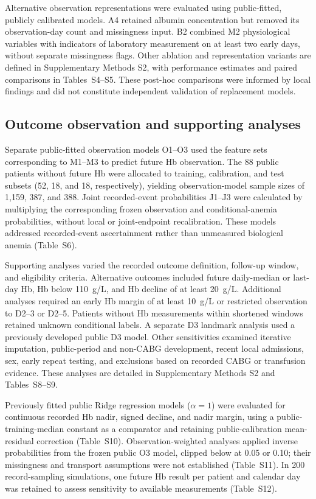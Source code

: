 \documentclass[pdflatex,sn-mathphys-num]{sn-jnl}%
\theoremstyle{thmstyleone}%
\theoremstyle{thmstyletwo}%
\theoremstyle{thmstylethree}%
\begin{document}
Alternative observation representations were evaluated using public-fitted, publicly calibrated models. A4 retained albumin concentration but removed its observation-day count and missingness input. B2 combined M2 physiological variables with indicators of laboratory measurement on at least two early days, without separate missingness flags. Other ablation and representation variants are defined in Supplementary Methods S2, with performance estimates and paired comparisons in Tables~S4--S5. These post-hoc comparisons were informed by local findings and did not constitute independent validation of replacement models.

\subsection{Outcome observation and supporting analyses}

Separate public-fitted observation models O1--O3 used the feature sets corresponding to M1--M3 to predict future Hb observation. The 88 public patients without future Hb were allocated to training, calibration, and test subsets (52, 18, and 18, respectively), yielding observation-model sample sizes of 1,159, 387, and 388. Joint recorded-event probabilities J1--J3 were calculated by multiplying the corresponding frozen observation and conditional-anemia probabilities, without local or joint-endpoint recalibration. These models addressed recorded-event ascertainment rather than unmeasured biological anemia (Table~S6).

Supporting analyses varied the recorded outcome definition, follow-up window, and eligibility criteria. Alternative outcomes included future daily-median or last-day Hb, Hb below 110~g/L, and Hb decline of at least 20~g/L. Additional analyses required an early Hb margin of at least 10~g/L or restricted observation to D2--3 or D2--5. Patients without Hb measurements within shortened windows retained unknown conditional labels. A separate D3 landmark analysis used a previously developed public D3 model. Other sensitivities examined iterative imputation, public-period and non-CABG development, recent local admissions, sex, early repeat testing, and exclusions based on recorded CABG or transfusion evidence. These analyses are detailed in Supplementary Methods S2 and Tables~S8--S9.

Previously fitted public Ridge regression models ($\alpha=1$) were evaluated for continuous recorded Hb nadir, signed decline, and nadir margin, using a public-training-median constant as a comparator and retaining public-calibration mean-residual correction (Table~S10). Observation-weighted analyses applied inverse probabilities from the frozen public O3 model, clipped below at 0.05 or 0.10; their missingness and transport assumptions were not established (Table~S11). In 200 record-sampling simulations, one future Hb result per patient and calendar day was retained to assess sensitivity to available measurements (Table~S12).
\end{document}
